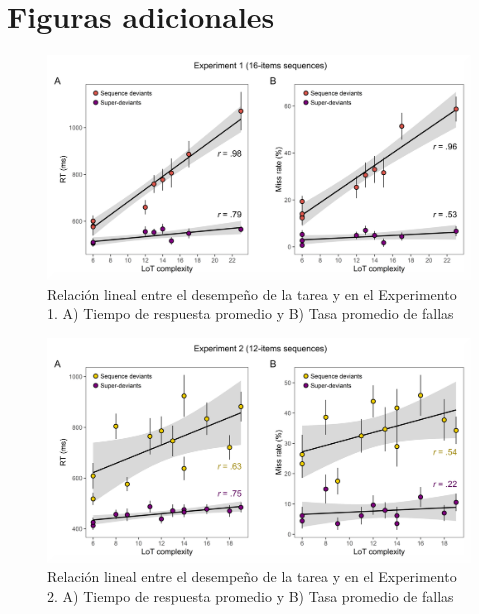 \section{Figuras adicionales}

\begin{figure}[t!]
      \includegraphics[scale=0.8]{figuras/plosbio/journal.pcbi.1008598.s001.png}
      \centering
      \caption{Relación lineal entre el desempeño de la tarea y \mdlbin en el Experimento 1. A) Tiempo de respuesta promedio y B) Tasa promedio de fallas}
      \label{PlosBIO-S1}
\end{figure}

\begin{figure}[t!]
      \includegraphics[scale=0.8]{figuras/plosbio/journal.pcbi.1008598.s002.png}
      \centering
      \caption{Relación lineal entre el desempeño de la tarea y \mdlbin en el Experimento 2. A) Tiempo de respuesta promedio y B) Tasa promedio de fallas}
      \label{PlosBIO-S2}
\end{figure}

